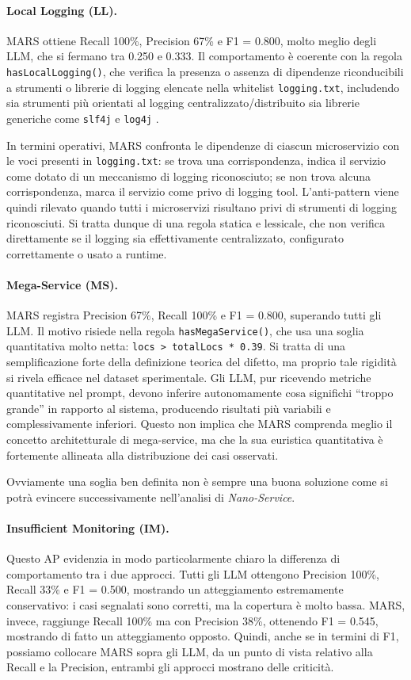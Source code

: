\paragraph{Local Logging (LL).}
MARS ottiene Recall 100\%, Precision 67\% e F1 = 0.800, molto meglio degli LLM, che si fermano tra 0.250 e 0.333. Il comportamento è coerente con la regola \texttt{hasLocalLogging()}, che verifica la presenza o assenza di dipendenze riconducibili a strumenti o librerie di logging elencate nella whitelist \texttt{logging.txt}, includendo sia strumenti più orientati al logging centralizzato/distribuito sia librerie generiche come \texttt{slf4j} e \texttt{log4j} \cite{MARS, madern2024_mars}.

In termini operativi, MARS confronta le dipendenze di ciascun microservizio con le voci presenti in \texttt{logging.txt}: se trova una corrispondenza, indica il servizio come dotato di un meccanismo di logging riconosciuto; se non trova alcuna corrispondenza, marca il servizio come privo di logging tool. L'anti-pattern viene quindi rilevato quando tutti i microservizi risultano privi di strumenti di logging riconosciuti. Si tratta dunque di una regola statica e lessicale, che non verifica direttamente se il logging sia effettivamente centralizzato, configurato correttamente o usato a runtime.

\paragraph{Mega-Service (MS).}
MARS registra Precision 67\%, Recall 100\% e F1 = 0.800, superando tutti gli LLM. Il motivo risiede nella regola \texttt{hasMegaService()}, che usa una soglia quantitativa molto netta: \texttt{locs > totalLocs * 0.39}. Si tratta di una semplificazione forte della definizione teorica del difetto, ma proprio tale rigidità si rivela efficace nel dataset sperimentale. Gli LLM, pur ricevendo metriche quantitative nel prompt, devono inferire autonomamente cosa significhi “troppo grande” in rapporto al sistema, producendo risultati più variabili e complessivamente inferiori. Questo non implica che MARS comprenda meglio il concetto architetturale di mega-service, ma che la sua euristica quantitativa è fortemente allineata alla distribuzione dei casi osservati.

Ovviamente una soglia ben definita non è sempre una buona soluzione come si potrà evincere successivamente nell'analisi di \textit{Nano-Service}.

\paragraph{Insufficient Monitoring (IM).}
Questo AP evidenzia in modo particolarmente chiaro la differenza di comportamento tra i due approcci. Tutti gli LLM ottengono Precision 100\%, Recall 33\% e F1 = 0.500, mostrando un atteggiamento estremamente conservativo: i casi segnalati sono corretti, ma la copertura è molto bassa. MARS, invece, raggiunge Recall 100\% ma con Precision 38\%, ottenendo F1 = 0.545, mostrando di fatto un atteggiamento opposto. 
Quindi, anche se in termini di F1, possiamo collocare MARS sopra gli LLM, da un punto di vista relativo alla Recall e la Precision, entrambi gli approcci mostrano delle criticità.

